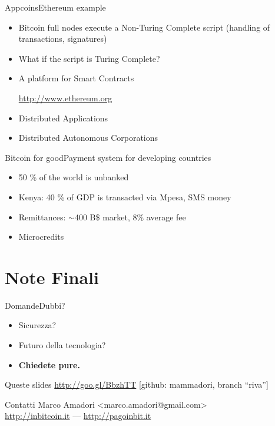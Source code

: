 \documentclass[english,compress]{beamer}
\begin{document}
\begin{frame}{Appcoins}{Ethereum example}
\begin{itemize}
 
 \item Bitcoin full nodes execute a Non-Turing Complete script (handling of transactions, signatures)
 \item What if the script is Turing Complete?
 \item A platform for Smart Contracts \begin{scriptsize}\url{http://www.ethereum.org}\end{scriptsize}
 \item Distributed Applications
 \item Distributed Autonomous Corporations
 \end{itemize}

 
\end{frame}



\begin{frame}{Bitcoin for good}{Payment system for developing countries}
\begin{itemize}
 \item 50 \% of the world is unbanked
 \item Kenya: 40 \% of GDP is transacted via Mpesa, SMS money
 \item Remittances: $\sim$400 B\$ market, 8\% average fee
 \item Microcredits
\end{itemize}
\end{frame}

\section{Note Finali}


\begin{frame}{Domande}{Dubbi?}
 \begin{itemize}
 \item Sicurezza?
 \item Futuro della tecnologia?
 \item \textbf{Chiedete pure.}
  \end{itemize}
 
  \begin{block}{Queste slides}
  \url{http://goo.gl/BbzhTT} [github: mammadori, branch ``riva'']
  \end{block}
\begin{block}{Contatti}
  Marco Amadori <marco.amadori@gmail.com> \\
  \url{http://inbitcoin.it} --- \url{http://pagoinbit.it}
  \end{block}

\end{frame}
\end{document}
